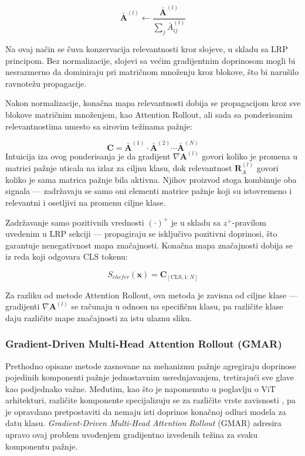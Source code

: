 \begin{equation}
    \bar{\mathbf{A}}^{(l)} \leftarrow \frac{\bar{\mathbf{A}}^{(l)}}
    {\sum_j \bar{A}^{(l)}_{ij}}
\end{equation}

Na ovaj način se čuva konzervacija relevantnosti kroz slojeve, u skladu sa LRP principom. Bez normalizacije, slojevi sa većim gradijentnim doprinosom mogli bi nesrazmerno da dominiraju pri matričnom množenju kroz blokove, što bi narušilo ravnotežu propagacije.


Nakon normalizacije, konačna mapa relevantnosti dobija se propagacijom kroz 
sve blokove matričnim množenjem, kao Attention Rollout, ali 
sada sa ponderisanim relevantnostima umesto sa sirovim težinama pažnje:

\begin{equation}
    \mathbf{C} = \bar{\mathbf{A}}^{(1)} \cdot \bar{\mathbf{A}}^{(2)} 
    \cdots \bar{\mathbf{A}}^{(N)}
\end{equation}
Intuicija iza ovog ponderisanja je 
da gradijent $\nabla \mathbf{A}^{(l)}$ govori koliko je promena u matrici 
pažnje uticala na izlaz za ciljnu klasu, dok relevantnost $\mathbf{R}_A^{(l)}$ 
govori koliko je sama matrica pažnje bila aktivna. Njihov proizvod stoga 
kombinuje oba signala — zadržavaju se samo oni elementi matrice pažnje koji 
su istovremeno i relevantni i osetljivi na promenu ciljne klase.

Zadržavanje samo pozitivnih vrednosti $(\cdot)^+$ je u skladu sa $z^+$-pravilom 
uvedenim u LRP sekciji — propagiraju se isključivo pozitivni doprinosi, što 
garantuje nenegativnost mapa značajnosti. Konačna mapa značajnosti dobija se 
iz reda koji odgovara CLS tokenu:

\begin{equation}
    S_{chefer}(\mathbf{x}) = \mathbf{C}_{[\text{CLS}, 1:N]}
\end{equation}

Za razliku od metode Attention Rollout, ova metoda je zavisna od ciljne 
klase — gradijenti $\nabla \mathbf{A}^{(l)}$ se računaju u odnosu na 
specifičnu klasu, pa različite klase daju različite mape značajnosti za istu 
ulaznu sliku.


\subsubsection{Gradient-Driven Multi-Head Attention Rollout (GMAR)}
Prethodno opisane metode zasnovane na mehanizmu pažnje agregiraju doprinose pojedinih komponenti pažnje jednostavnim usrednjavanjem, tretirajući sve glave kao podjednako
važne. Međutim, kao što je napomenuto u poglavlju o ViT arhitekturi, različite 
komponente specijalizuju se za različite vrste zavisnosti \cite{voita2019analyzing}, 
pa je opravdano pretpostaviti da nemaju isti doprinos konačnoj odluci modela za 
datu klasu. \textit{Gradient-Driven Multi-Head Attention Rollout} (GMAR) 
\cite{jo2025gmar} adresira upravo ovaj problem uvođenjem gradijentno izvedenih težina 
za svaku komponentu pažnje.

